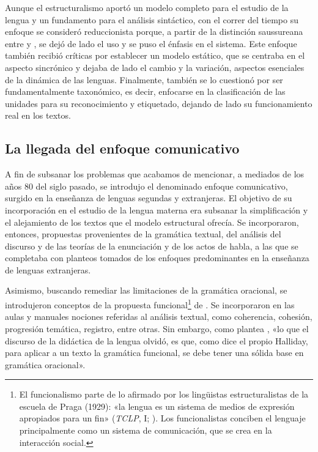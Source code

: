 Aunque el estructuralismo aportó un modelo completo para el estudio de la
lengua y un fundamento para el análisis sintáctico, con el correr del tiempo su
enfoque se consideró reduccionista porque, a partir de la distinción
saussureana entre  y , se dejó de lado el uso y
se puso el énfasis en el sistema. Este enfoque también recibió críticas por
establecer un modelo estático, que se centraba en el aspecto sincrónico y
dejaba de lado el cambio y la variación, aspectos esenciales de la dinámica de
las lenguas. Finalmente, también se lo cuestionó por ser fundamentalmente
taxonómico, es decir, enfocarse en la clasificación de las unidades para su
reconocimiento y etiquetado, dejando de lado su funcionamiento real en los
textos.

\subsection{La llegada del enfoque comunicativo}

A fin de subsanar los problemas que acabamos de mencionar, a mediados de los
años 80 del siglo pasado, se introdujo el denominado enfoque comunicativo,
surgido en la enseñanza de lenguas segundas y extranjeras. El objetivo de su
incorporación en el estudio de la lengua materna era subsanar la simplificación
y el alejamiento de los textos que el modelo estructural ofrecía. Se
incorporaron, entonces, propuestas provenientes de la gramática textual, del
análisis del discurso y de las teorías de la enunciación y de los actos de
habla, a las que se completaba con planteos tomados de los enfoques
predominantes en la enseñanza de lenguas extranjeras.

Asimismo, buscando remediar las limitaciones de la gramática oracional, se
introdujeron conceptos de la propuesta funcional\footnote{\label{fn:01-funcionalismo}El
funcionalismo parte de lo afirmado por los lingüistas estructuralistas de la
escuela de Praga (1929): «la lengua es un sistema de medios de expresión
apropiados para un fin» (\textit{TCLP}, I; \cite{aavv1929}). Los
funcionalistas conciben el lenguaje principalmente como un sistema de
comunicación, que se crea en la interacción social.} de
\textcite{halliday1976}. Se incorporaron en las aulas y manuales nociones
referidas al análisis textual, como coherencia, cohesión, progresión temática,
registro, entre otras. Sin embargo, como plantea \textcite[104]{gaiser2011},
«lo que el discurso de la didáctica de la lengua olvidó, es que, como dice el
propio Halliday, para aplicar a un texto la gramática funcional, se debe tener
una sólida base en gramática oracional».

